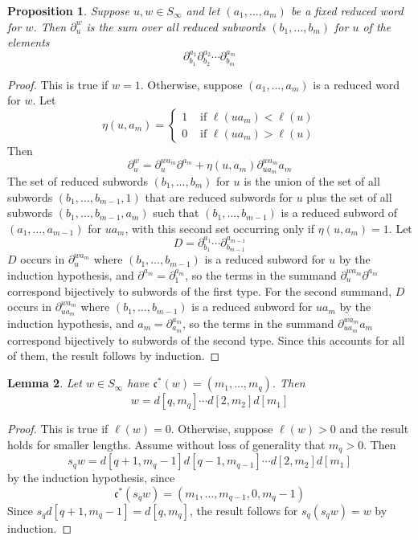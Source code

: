 \documentclass[reqno]{amsart}
\newtheorem{lemma}{Lemma}[subsection]
\newtheorem{proposition}[lemma]{Proposition}
\theoremstyle{definition}
\theoremstyle{remark}
\numberwithin{equation}{subsection}
\newcommand{\code}{\mathfrak{c}}
\begin{document}
\begin{proposition} \label{proposition:divcompute}
Suppose $u,w\in S_\infty$ and let $(a_1,\ldots,a_m)$ be a fixed reduced word for $w$. Then $\partial_u^w$ is the sum over all reduced subwords $(b_1,\ldots,b_m)$ for $u$ of the elements
$$\partial_{b_1}^{a_1}\partial_{b_2}^{a_2}\cdots\partial_{b_m}^{a_m}$$
\end{proposition}
\begin{proof}
This is true if $w=1$. Otherwise, suppose $(a_1,\ldots,a_m)$ is a reduced word for $w$. Let 
$$\eta(u,a_m)=\begin{cases}1&\mbox{ if }\ell(ua_m)<\ell(u)\\
0&\mbox{ if }\ell(ua_m)>\ell(u)
\end{cases}$$
Then
$$\partial_u^w=\partial_u^{wa_m}\partial^{a_m}+\eta(u,a_m)\partial_{ua_m}^{wa_m}a_m$$
The set of reduced subwords $(b_1,\ldots,b_m)$ for $u$ is the union of the set of all subwords $(b_1,\ldots,b_{m-1},1)$ that are reduced subwords for $u$ plus the set of all subwords $(b_1,\ldots,b_{m-1},a_m)$ such that $(b_1,\ldots,b_{m-1})$ is a reduced subword of $(a_1,\ldots,a_{m-1})$ for $ua_m$, with this second set occurring only if $\eta(u,a_m)=1$. Let
$$D=\partial_{b_1}^{a_1}\cdots\partial_{b_{m-1}}^{a_{m-1}}$$
$D$ occurs in $\partial_{u}^{wa_m}$ where $(b_1,\ldots,b_{m-1})$ is a reduced subword for $u$ by the induction hypothesis, and $\partial^{a_m}=\partial_{1}^{a_m}$, so the terms in the summand $\partial_u^{wa_m}\partial^{a_m}$ correspond bijectively to subwords of the first type. For the second summand, $D$ occurs in $\partial_{ua_m}^{wa_m}$ where $(b_1,\ldots,b_{m-1})$ is a reduced subword for $ua_m$ by the induction hypothesis, and $a_m=\partial_{a_m}^{a_m}$, so the terms in the summand $\partial_{ua_m}^{wa_m}a_m$ correspond bijectively to subwords of the second type. Since this accounts for all of them, the result follows by induction.
\end{proof}


\begin{lemma} \label{lemma:coderesult}
Let $w\in S_\infty$ have $\code^*(w)=(m_1,\ldots,m_q)$. Then
$$w=d[q,m_q]\cdots d[2,m_2]d[m_1]$$
\end{lemma}
\begin{proof}
This is true if $\ell(w)=0$. Otherwise, suppose $\ell(w)>0$ and the result holds for smaller lengths. Assume without loss of generality that $m_q>0$. Then
$$s_qw=d[q+1,m_q-1]d[q-1,m_{q-1}]\cdots d[2,m_2]d[m_1]$$
by the induction hypothesis, since
$$\code^*(s_qw)=(m_1,\ldots,m_{q-1},0,m_q-1)$$
Since $s_qd[q+1,m_q-1]=d[q,m_q]$, the result follows for $s_q(s_qw)=w$ by induction.
\end{proof}
\end{document}
